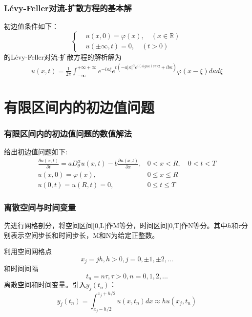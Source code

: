 \documentclass[notheorems,serif]{beamer}
\begin{document}
\begin{frame}
\frametitle{Lévy-Feller对流-扩散方程的基本解}
\qquad 初边值条件如下：
	\begin{equation*}
	\left\{
	\begin{aligned}
	& u(x, 0)=\varphi(x), \quad (x \in \mathbb{R}) 
	\\	& u( \pm \infty, t)=0, \quad (t>0)
	\end{aligned}
	\right.
	\end{equation*}	
	的Lévy-Feller对流-扩散方程的解析解为
	\begin{equation*}
	\begin{aligned}
	u(x, t) =\frac{1}{2 \pi} \int_{-\infty}^{+\infty+\infty} e^{-i \kappa \xi} e^{t\left(-a|\kappa|^{\alpha} e^{i(s i g n \kappa) \theta \pi / 2}+i b \kappa\right)} \varphi(x-\xi) d \kappa d \xi
	\end{aligned}
	\end{equation*}
\end{frame}


\section{有限区间内的初边值问题}
\begin{frame}
\frametitle{有限区间内的初边值问题的数值解法}
\qquad 给出初边值问题如下:
\begin{equation} 
\begin{array}{ll}{\frac{\partial u(x, t)}{\partial t}=a D_{\theta}^{\alpha} u(x, t)-b \frac{\partial u(x, t)}{\partial x},} & {0<x<R, \quad 0<t<T} \\ {u(x, 0)=\varphi(x),} & {0 \leq x \leq R} \\ {u(0, t)=u(R, t)=0,} & {0 \leq t \leq T}\end{array}
\end{equation}
\end{frame}

\begin{frame}
\frametitle{离散空间与时间变量}
先进行网格剖分，将空间区间[0,L]作M等分，时间区间[0,T]作N等分。其中$h$和$\tau$分别表示空间步长和时间步长，M和N为给定正整数。

利用空间网格点
$$x_{j}=jh,h>0,j=0,\pm1,\pm2,...$$
和时间间隔
$$t_{n}=n\tau,\tau>0,n=0,1,2,...$$
离散空间和时间变量。引入$y_j(t_n)：$
$$y_{j}\left(t_{n}\right)=\int_{x_{j}-h / 2}^{x_{j}+h / 2} u\left(x, t_{n}\right) d x \approx h u\left(x_{j}, t_{n}\right)$$
\end{frame}
\end{document}
